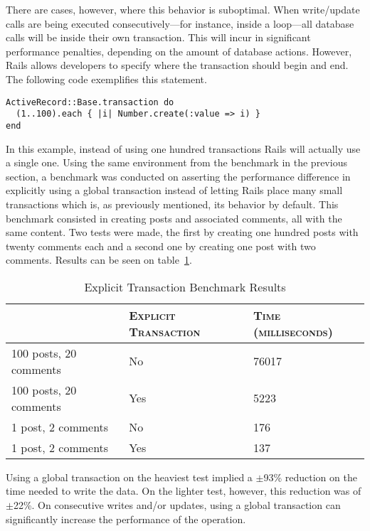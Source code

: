 There are cases, however, where this behavior is suboptimal. When write/update calls are being executed consecutively---for instance, inside a loop---all database calls will be inside their own transaction. This will incur in significant performance penalties, depending on the amount of database actions. However, Rails allows developers to specify where the transaction should begin and end. The following code exemplifies this statement.
\begin{lstlisting}[xleftmargin=30pt,xrightmargin=30pt]
ActiveRecord::Base.transaction do
  (1..100).each { |i| Number.create(:value => i) }
end
\end{lstlisting}
In this example, instead of using one hundred transactions Rails will actually use a single one. Using the same environment from the benchmark in the previous section, a benchmark was conducted on asserting the performance difference in explicitly using a global transaction instead of letting Rails place many small transactions which is, as previously mentioned, its behavior by default. This benchmark consisted in creating posts and associated comments, all with the same content. Two tests were made, the first by creating one hundred posts with twenty comments each and a second one by creating one post with two comments. Results can be seen on table~\ref{tab:transaction}.
\begin{table}[ht]
  \centering
  
  \begin{tabular}{l|l|l}
  & \textsc{Explicit Transaction}
  & \textsc{Time (milliseconds)} \\
  \hline
  100 posts, 20 comments & No & 76017 \\
  100 posts, 20 comments & Yes & 5223 \\
  1 post, 2 comments & No & 176 \\
  1 post, 2 comments & Yes & 137 \\
  
  \end{tabular}
  \caption{Explicit Transaction Benchmark Results}
  \label{tab:transaction}
\end{table}
Using a global transaction on the heaviest test implied a $\pm$93\% reduction on the time needed to write the data. On the lighter test, however, this reduction was of $\pm$22\%. On consecutive writes and/or updates, using a global transaction can significantly increase the performance of the operation.

